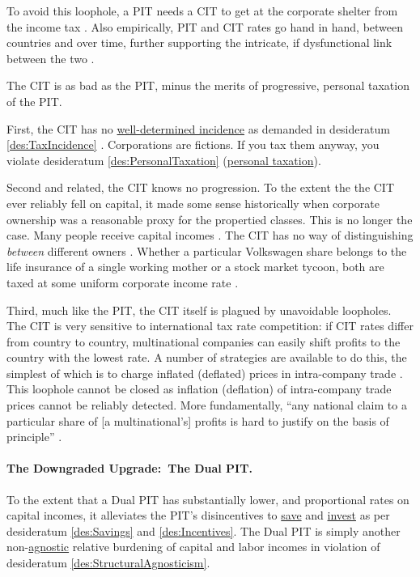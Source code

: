 To avoid this loophole, a PIT needs a CIT to get at the corporate shelter from the income tax \citep[7]{Genschel2005}.
Also empirically, PIT and CIT rates go hand in hand, between countries and over time, further supporting the intricate, if dysfunctional link between the two \citep[14]{Piatkowski2008}.

The CIT is as bad as the PIT, minus the merits of progressive, personal taxation of the PIT.

First, the CIT has no \hyperref[des:TaxIncidence]{well-determined incidence} as demanded in desideratum \ref{des:TaxIncidence} \citep[918]{McCaffery2005}.
Corporations are fictions.
If you tax them anyway, you violate desideratum \ref{des:PersonalTaxation} (\hyperref[des:PersonalTaxation]{personal taxation}).

Second and related, the CIT knows no progression.
To the extent the the CIT ever reliably fell on capital, it made some sense historically when corporate ownership was a reasonable proxy for the propertied classes.
This is no longer the case.
Many people receive capital incomes \citep[XV]{Grabka2007a}.
The CIT has no way of distinguishing \emph{between} different owners \citep[918]{McCaffery2005}.
Whether a particular Volkswagen share belongs to the life insurance of a single working mother or a stock market tycoon, both are taxed at some uniform corporate income rate .

Third, much like the PIT, the CIT itself is plagued by unavoidable loopholes.
The CIT is very sensitive to international tax rate competition:
if CIT rates differ from country to country, multinational companies can easily shift profits to the country with the lowest rate.
A number of strategies are available to do this, the simplest of which is to charge inflated (deflated) prices in intra-company trade \citep[43ff]{Ganghof2004}.
This loophole cannot be closed as inflation (deflation) of intra-company trade prices cannot be reliably detected.
More fundamentally, ``any national claim to a particular share of [a multinational's] profits is hard to justify on the basis of principle'' \citep[61]{Genschel2005}.


\paragraph{The Downgraded Upgrade:\ The Dual PIT.}
	\label{sec:ScoreDualPIT}
To the extent that a Dual PIT has substantially lower, and proportional rates on capital incomes, it alleviates the PIT's disincentives to \hyperref[des:Savings]{save} and \hyperref[des:Incentives]{invest} as per desideratum \ref{des:Savings} and \ref{des:Incentives}.
The Dual PIT is simply another non-\hyperref[des:StructuralAgnosticism]{agnostic} relative burdening of capital and labor incomes in violation of desideratum \ref{des:StructuralAgnosticism}.

